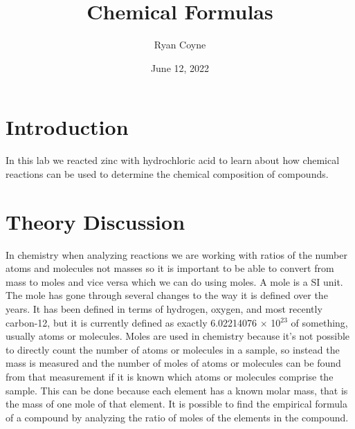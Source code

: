 \documentclass[12pt]{article}
\begin{document}
    \title{Chemical Formulas}
    \date{June 12, 2022}
    \author{Ryan Coyne}
    \maketitle
    \section*{Introduction}
        In this lab we reacted zinc with hydrochloric acid to learn about how chemical reactions can be used to determine the chemical composition of compounds.
    \section*{Theory Discussion}
        In chemistry when analyzing reactions we are working with ratios of the number atoms and molecules not masses so it is important to be able to convert from mass to moles and vice versa which we can do using moles. A mole is a SI unit. The mole has gone through several changes to the way it is defined over the years. It has been defined in terms of hydrogen, oxygen, and most recently carbon-12, but it is currently defined as exactly 6.02214076 \(\times\) 10\(^{23}\) of something, usually atoms or molecules. Moles are used in chemistry because it's not possible to directly count the number of atoms or molecules in a sample, so instead the mass is measured and the number of moles of atoms or molecules can be found from that measurement if it is known which atoms or molecules comprise the sample. This can be done because each element has a known molar mass, that is the mass of one mole of that element. It is possible to find the empirical formula of a compound by analyzing the ratio of moles of the elements in the compound.
\end{document}
